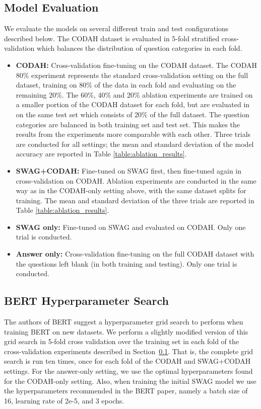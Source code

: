 \documentclass[11pt,a4paper]{article}
\begin{document}
    \subsection{Model Evaluation}
    \label{sec:model_eval}
    We evaluate the models on several different train and test configurations described below. The CODAH dataset is evaluated in 5-fold stratified cross-validation which balances the distribution of question categories in each fold. 
    \begin{itemize}
        \item \textbf{CODAH:} Cross-validation fine-tuning on the CODAH dataset. The CODAH 80\% experiment represents the standard cross-validation setting on the full dataset, training on 80\% of the data in each fold and evaluating on the remaining 20\%. The 60\%, 40\% and 20\% ablation experiments are trained on a smaller portion of the CODAH dataset for each fold, but are evaluated in on the same test set which consists of 20\% of the full dataset. The question categories are balanced in both training set and test set. This makes the results from the experiments more comparable with each other. Three trials are conducted for all settings; the mean and standard deviation of the model accuracy are reported in Table \ref{table:ablation_results}.
        \item \textbf{SWAG+CODAH:} Fine-tuned on SWAG first, then fine-tuned again in cross-validation on CODAH. Ablation experiments are conducted in the same way as in the CODAH-only setting above, with the same dataset splits for training. The mean and standard deviation of the three trials are reported in Table \ref{table:ablation_results}.
        \item \textbf{SWAG only:} Fine-tuned on SWAG and evaluated on CODAH. Only one trial is conducted.
        \item \textbf{Answer only:} Cross-validation fine-tuning on the full CODAH dataset with the questions left blank (in both training and testing). Only one trial is conducted.
    \end{itemize}

\subsection{BERT Hyperparameter Search}
    \label{sec:bert_grid_search}
    The authors of BERT suggest a hyperparameter grid search to perform when training BERT on new datasets. We perform a slightly modified version of this grid search in 5-fold cross validation over the training set in each fold of the cross-validation experiments described in Section~\ref{sec:model_eval}. That is, the complete grid search is run ten times, once for each fold of the CODAH and SWAG+CODAH settings. For the answer-only setting, we use the optimal hyperparameters found for the CODAH-only setting. Also, when training the initial SWAG model we use the hyperparameters recommended in the BERT paper, namely a batch size of 16, learning rate of 2e-5, and 3 epochs.
\end{document}
